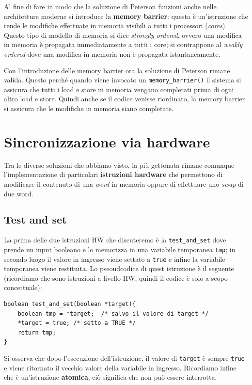 Al fine di fare in modo che la soluzione di Peterson funzioni anche nelle architetture moderne si introduce la \textbf{memory barrier}: questa è un'istruzione che rende le modifiche effettuate in memoria visibili a tutti i processori (\textit{cores}). Questo tipo di modello di memoria si dice \textit{strongly ordered}, ovvero una modifica in memoria è propagata immediatamente a tutti i core; si contrappone al \textit{weakly ordered} dove una modifica in memoria non è propagata istantaneamente. 

Con l'introduzione delle memory barrier ora la soluzione di Peterson rimane valida. Questo perché quando viene invocato un \texttt{memory\_barrier()} il sistema si assicura che tutti i load e store in memoria vengano completati prima di ogni altro load e store. Quindi anche se il codice venisse riordinato, la memory barrier si assicura che le modifiche in memoria siano completate. 
% 
\section{Sincronizzazione via hardware}
Tra le diverse soluzioni che abbiamo visto, la più gettonata rimane comunque l'implementazione di particolari \textbf{istruzioni hardware} che permettono di modificare il contenuto di una \textit{word} in memoria oppure di effettuare uno \textit{swap} di due word.

\subsection{Test and set}
La prima delle due istruzioni HW che discuteremo è la \texttt{test\_and\_set} dove prende un input booleano e lo memorizza in una variabile temporanea \texttt{tmp}; in secondo luogo il valore in ingresso viene settato a \texttt{true} e infine la variabile temporanea viene restituita. Lo pseoudcodice di quest istruzione è il seguente (ricordiamo che sono istruzioni a livello HW, quindi il codice è solo a scopo concettuale):
\begin{lstlisting}
boolean test_and_set(boolean *target){
    boolean tmp = *target;  /* salvo il valore di target */ 
    *target = true; /* setto a TRUE */
    return tmp;
}
\end{lstlisting}
Si osserva che dopo l'esecuzione dell'istruzione, il valore di \texttt{target} è sempre \texttt{true} e viene ritornato il vecchio valore della variabile in ingresso. Ricordiamo infine che è un'istruzione \textbf{atomica}, ciò significa che non può essere interrotta.

